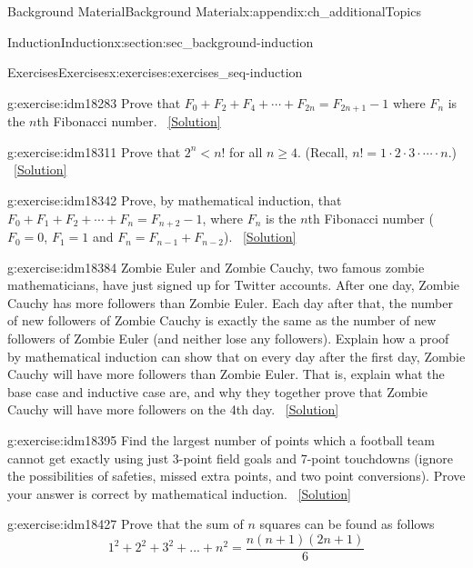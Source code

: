 \documentclass[oneside,10pt,]{book}
\numberwithin{equation}{chapter}
\newcommand{\lt}{<}
\begin{document}
\begin{appendixptx}{Background Material}{}{Background Material}{}{}{x:appendix:ch_additionalTopics}
\begin{sectionptx}{Induction}{}{Induction}{}{}{x:section:sec_background-induction}
\begin{exercises-subsection}{Exercises}{}{Exercises}{}{}{x:exercises:exercises_seq-induction}
\begin{divisionexercise}{4}{}{}{g:exercise:idm18283}
Prove that \(F_0 + F_2 + F_4 + \cdots + F_{2n} = F_{2n+1} - 1\) where \(F_n\) is the \(n\)th Fibonacci number.%
\qquad~\hfill{\tiny\hyperlink{g:solution:idm18289-main}{[Solution]}}\end{divisionexercise}%
\begin{divisionexercise}{5}{}{}{g:exercise:idm18311}%
Prove that \(2^n \lt  n!\) for all \(n \ge 4\). (Recall, \(n! = 1\cdot 2 \cdot 3 \cdot \cdots\cdot n\).)%
\qquad~\hfill{\tiny\hyperlink{g:solution:idm18317-main}{[Solution]}}\end{divisionexercise}%
\begin{divisionexercise}{6}{}{}{g:exercise:idm18342}%
Prove, by mathematical induction, that \(F_0 + F_1 + F_2 + \cdots + F_{n} = F_{n+2} - 1\), where \(F_n\) is the \(n\)th Fibonacci number (\(F_0 = 0\), \(F_1 = 1\) and \(F_n = F_{n-1} + F_{n-2}\)).%
\qquad~\hfill{\tiny\hyperlink{g:solution:idm18351-main}{[Solution]}}\end{divisionexercise}%
\begin{divisionexercise}{7}{}{}{g:exercise:idm18384}%
Zombie Euler and Zombie Cauchy, two famous zombie mathematicians, have just signed up for Twitter accounts. After one day, Zombie Cauchy has more followers than Zombie Euler. Each day after that, the number of new followers of Zombie Cauchy is exactly the same as the number of new followers of Zombie Euler (and neither lose any followers). Explain how a proof by mathematical induction can show that on every day after the first day, Zombie Cauchy will have more followers than Zombie Euler. That is, explain what the base case and inductive case are, and why they together prove that Zombie Cauchy will have more followers on the 4th day.%
\qquad~\hfill{\tiny\hyperlink{g:solution:idm18387-main}{[Solution]}}\end{divisionexercise}%
\begin{divisionexercise}{8}{}{}{g:exercise:idm18395}%
Find the largest number of points which a football team cannot get exactly using just 3-point field goals and 7-point touchdowns (ignore the possibilities of safeties, missed extra points, and two point conversions). Prove your answer is correct by mathematical induction.%
\qquad~\hfill{\tiny\hyperlink{g:solution:idm18398-main}{[Solution]}}\end{divisionexercise}%
\begin{divisionexercise}{9}{}{}{g:exercise:idm18427}%
Prove that the sum of \(n\) squares can be found as follows%
\begin{equation*}
1^2 +2^2 +3^2+...+n^2 = \frac{n(n+1)(2n+1)}{6}

\end{equation*}
\end{divisionexercise}
\end{exercises-subsection}
\end{sectionptx}
\end{appendixptx}
\end{document}
